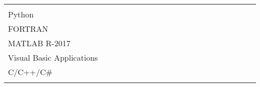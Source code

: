 \documentclass[11pt, letterpaper]{extarticle}
\begin{document}
	\begin{longtable}{L{1.012\linewidth}N}
		                                                                                                                                                                                                                                                                                                             & \\[-0.25cm]
		Python                                                                                                                                                                                                                                                                                                       & \\[0.40cm]
		FORTRAN                                                                                                                                                                                                                                                                                                      & \\[0.40cm]
		MATLAB R-2017                                                                                                                                                                                                                                                                                                & \\[0.40cm]
		Visual Basic Applications                                                                                                                                                                                                                                                                                    & \\[0.40cm]
		C/C++/C\#                                                                                                                                                                                                                                                                                                    & \\[0.40cm]
		                                                                                                                                                                                                                                                                                                             & \\[-0.25cm] \hline
	\end{longtable}
\end{document}
